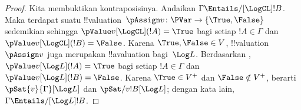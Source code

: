 \documentclass[../../../include/open-logic-section]{subfiles}
\begin{document}
\begin{proof}
  Kita membuktikan kontraposisinya. Andaikan
  $\Gamma\Entails/[\LogCL]!B$. Maka terdapat suatu
  !!{valuation}~$\pAssign v\colon\PVar\to\{\True,\False\}$ sedemikian
  sehingga $\pValue v[\LogCL](!A)=\True$ bagi setiap $!A\in\Gamma$ dan
  $\pValue v[\LogCL](!B)=\False$. Karena $\True,\False\in V$,
  !!{valuation}~$\pAssign v$ juga merupakan !!a{valuation} bagi~$\Log L$.
  Berdasarkan , $\pValue v[\Log L](!A)=\True$ bagi setiap
  $!A\in\Gamma$ dan $\pValue v[\Log L](!B)=\False$. Karena
  $\True\in V^+$ dan $\False\notin V^+$, berarti
  $\pSat{v}{\Gamma}[\Log L]$ dan $\pSat/{v}{!B}[\Log L]$; dengan kata lain,
  $\Gamma\Entails/[\Log L]!B$.
\end{proof}
\end{document}
